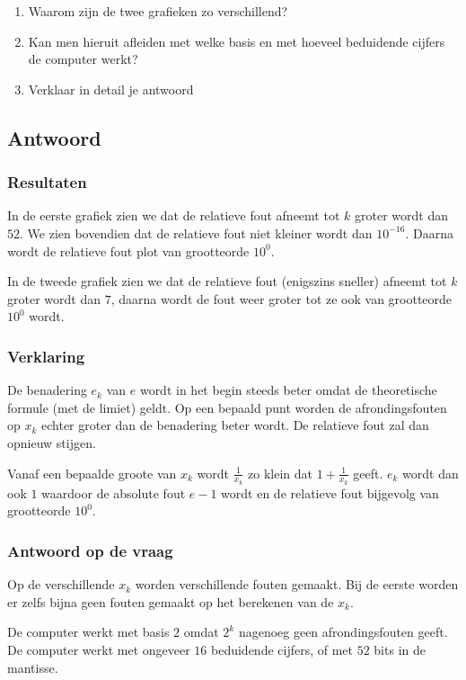 \begin{enumerate}
\item Waarom zijn de twee grafieken zo verschillend?
\item Kan men hieruit afleiden met welke basis en met hoeveel beduidende cijfers de computer werkt?
\item Verklaar in detail je antwoord
\end{enumerate}

\subsection{Antwoord}
\subsubsection{Resultaten}
In de eerste grafiek zien we dat de relatieve fout afneemt tot $k$ groter wordt dan $52$. We zien bovendien dat de relatieve fout niet kleiner wordt dan $10^{-16}$. Daarna wordt de relatieve fout plot van grootteorde $10^{0}$.

In de tweede grafiek zien we dat de relatieve fout (enigszins sneller) afneemt tot $k$ groter wordt dan $7$, daarna wordt de fout weer groter tot ze ook van grootteorde $10^{0}$ wordt.

\subsubsection{Verklaring}
De benadering $e_k$ van $e$ wordt in het begin steeds beter omdat de theoretische formule (met de limiet) geldt. Op een bepaald punt worden de afrondingsfouten op $x_k$ echter groter dan de benadering beter wordt. De relatieve fout zal dan opnieuw stijgen.

Vanaf een bepaalde groote van $x_k$ wordt $\frac{1}{x_k}$ zo klein dat $1 + \frac{1}{x_k}$ geeft. $e_k$ wordt dan ook $1$ waardoor de absolute fout $e - 1$ wordt en de relatieve fout bijgevolg van grootteorde $10^{0}$.

\subsubsection{Antwoord op de vraag}
Op de verschillende $x_k$ worden verschillende fouten gemaakt. Bij de eerste worden er zelfs bijna geen fouten gemaakt op het berekenen van de $x_k$.

De computer werkt met basis $2$ omdat $2^k$ nagenoeg geen afrondingsfouten geeft. De computer werkt met ongeveer $16$ beduidende cijfers, of met $52$ bits in de mantisse.
